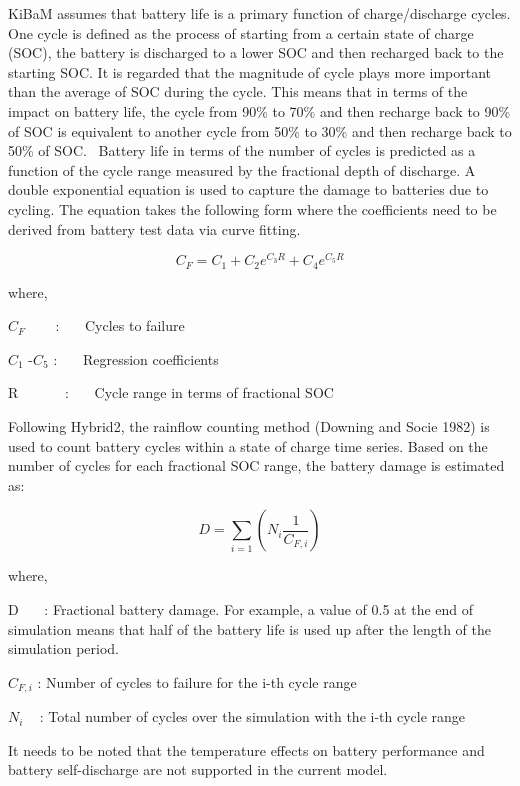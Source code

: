 KiBaM assumes that battery life is a primary function of charge/discharge cycles. One cycle is defined as the process of starting from a certain state of charge (SOC), the battery is discharged to a lower SOC and then recharged back to the starting SOC. It is regarded that the magnitude of cycle plays more important than the average of SOC during the cycle. This means that in terms of the impact on battery life, the cycle from 90\% to 70\% and then recharge back to 90\% of SOC is equivalent to another cycle from 50\% to 30\% and then recharge back to 50\% of SOC.~ Battery life in terms of the number of cycles is predicted as a function of the cycle range measured by the fractional depth of discharge. A double exponential equation is used to capture the damage to batteries due to cycling. The equation takes the following form where the coefficients need to be derived from battery test data via curve fitting.

\begin{equation}
{C_F} = {C_1} + {C_2}{e^{{C_3}R}} + {C_4}{e^{{C_5}R}}
\end{equation}

where,

\({C_F}\) ~~~ :~~~ Cycles to failure

\({C_1}\) -\({C_5}\) :~~~ Regression coefficients

R~~~~~~ :~~~ Cycle range in terms of fractional SOC

Following Hybrid2, the rainflow counting method (Downing and Socie 1982) is used to count battery cycles within a state of charge time series. Based on the number of cycles for each fractional SOC range, the battery damage is estimated as:

\begin{equation}
D = \sum\limits_{i = 1}^{} {\left( {{N_i}\frac{1}{{{C_{F,i}}}}} \right)}
\end{equation}

where,

D~~~ : Fractional battery damage. For example, a value of 0.5 at the end of simulation means that half of the battery life is used up after the length of the simulation period.

\({C_{F,i}}\) : Number of cycles to failure for the i-th cycle range

\({N_i}\) ~ : Total number of cycles over the simulation with the i-th cycle range

It needs to be noted that the temperature effects on battery performance and battery self-discharge are not supported in the current model.

